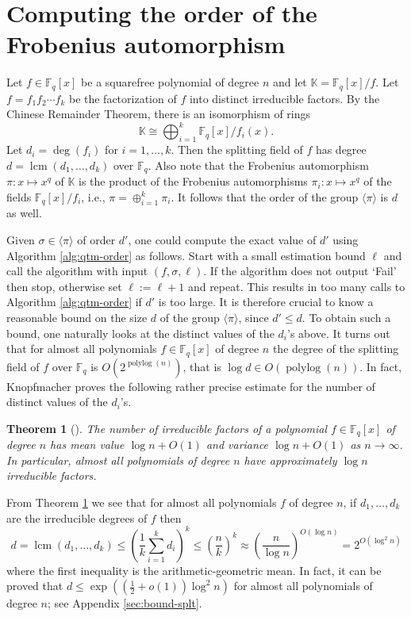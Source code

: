\documentclass[11pt]{article}
\theoremstyle{plain}
\newtheorem{theorem}{Theorem}
\theoremstyle{definition}
\newcommand{\lrang}[1]{\langle#1\rangle}
\DeclareMathOperator{\lcm}{lcm} %
\DeclareMathOperator{\polylog}{polylog}
\def\K{\ensuremath{\mathbb{K}}}
\def\F{\ensuremath{\mathbb{F}}}
\begin{document}

\section{Computing the order of the Frobenius automorphism}

Let $f \in \F_q[x]$ be a squarefree polynomial of degree $n$ and let $\K = \F_q[x] / f$. Let $f = 
f_1f_2 \cdots f_k$ be the factorization of $f$ into distinct irreducible factors. By the Chinese 
Remainder Theorem, there is an isomorphism of rings
\begin{equation}
\label{equ:crt}
	\K \cong \bigoplus_{i = 1}^k \F_q[x] / f_i(x).
\end{equation}
Let $d_i = \deg(f_i)$ for $i = 1, \dots, k$. Then the splitting field of $f$ has degree $d = 
\lcm(d_1, \dots, d_k)$ over $\F_q$. Also note that the Frobenius automorphism $\pi: x \mapsto x^q$ 
of $\K$ is the product of the Frobenius automorphisms $\pi_i: x \mapsto x^q$ of the fields $\F_q[x] 
/ f_i$, i.e., $\pi = \oplus_{i = 1}^k \pi_i$. It follows that the order of the group $\lrang{\pi}$ 
is $d$ as well.

Given $\sigma \in \lrang{\pi}$ of order $d'$, one could compute the exact value of $d'$ using 
Algorithm \ref{alg:qtm-order} as follows. Start with a small estimation bound $\ell$ and call the 
algorithm with input $(f, \sigma, \ell)$. If the algorithm does not output `Fail' then stop, 
otherwise set $\ell := \ell + 1$ and repeat. This results in too many calls to Algorithm 
\ref{alg:qtm-order} if $d'$ is too large. It is therefore crucial to know a reasonable bound on the 
size $d$ of the group $\lrang{\pi}$, since $d' \le d$. To obtain such a bound, one naturally looks 
at the distinct values of the $d_i$'s above. It turns out that for almost all polynomials $f \in 
\F_q[x]$ of degree $n$ the degree of the splitting field of $f$ over $\F_q$ is $O(2^{\polylog(n)})$, 
that is $\log d \in O(\polylog(n))$. In fact, Knopfmacher proves the following rather precise 
estimate for the number of distinct values of the $d_i$'s.
\begin{theorem}[\cite{knopfmacher1999degrees}]
	\label{thm:d-mean}
	The number of irreducible factors of a polynomial $f \in \F_q[x]$ of degree $n$ has mean value 
	$\log n + O(1)$ and variance $\log n + O(1)$ as $n \rightarrow \infty$. In particular, almost 
	all polynomials of degree $n$ have approximately $\log n$ irreducible factors.
\end{theorem}
From Theorem \ref{thm:d-mean} we see that for almost all polynomials $f$ of degree $n$, if $d_1, 
\dots, d_k$ are the irreducible degrees of $f$ then 
\begin{equation}
	\label{equ:ag-mean}
	d = \lcm(d_1, \dots, d_k) \le \left( \frac{1}{k} \sum_{i = 1}^kd_i \right)^k \le \left( 
	\frac{n}{k} \right)^k \approx \left( \frac{n}{\log n} \right)^{O(\log n)} = 2^{O(\log^2n)}
\end{equation}
where the first inequality is the arithmetic-geometric mean. In fact, it can be proved that $d \le 
\exp((\frac{1}{2} + o(1))\log^2n)$ for almost all polynomials of degree $n$; see Appendix 
\ref{sec:bound-splt}.
\end{document}
